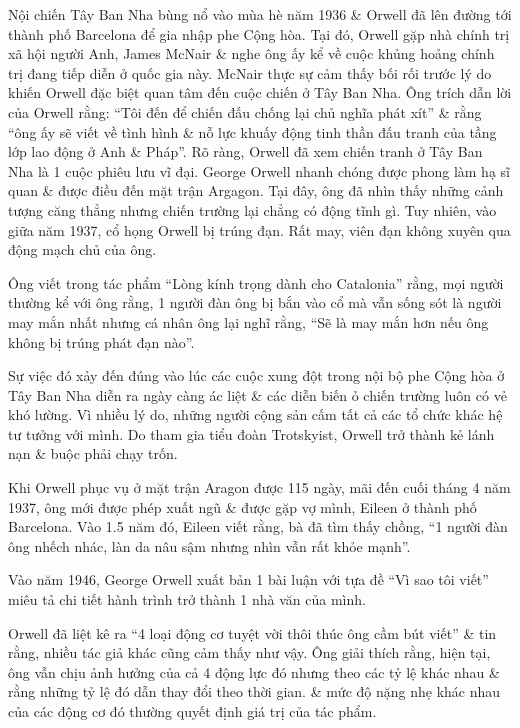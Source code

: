 \documentclass[oneside]{book}
\numberwithin{equation}{section}
\begin{document}
Nội chiến Tây Ban Nha bùng nổ vào mùa hè năm 1936 \& Orwell đã lên đường tới thành phố Barcelona để gia nhập phe Cộng hòa. Tại đó, Orwell gặp nhà chính trị xã hội người Anh, James McNair \& nghe ông ấy kể về cuộc khủng hoảng chính trị đang tiếp diễn ở quốc gia này. McNair thực sự cảm thấy bối rối trước lý do khiến Orwell đặc biệt quan tâm đến cuộc chiến ở Tây Ban Nha. Ông trích dẫn lời của Orwell rằng: ``Tôi đến để chiến đấu chống lại chủ nghĩa phát xít'' \& rằng ``ông ấy sẽ viết về tình hình \& nỗ lực khuấy động tinh thần đấu tranh của tầng lớp lao động ở Anh \& Pháp''. Rõ ràng, Orwell đã xem chiến tranh ở Tây Ban Nha là 1 cuộc phiêu lưu vĩ đại. George Orwell nhanh chóng được phong làm hạ sĩ quan \& được điều đến mặt trận Argagon. Tại đây, ông đã nhìn thấy những cảnh tượng căng thẳng nhưng chiến trường lại chẳng có động tĩnh gì. Tuy nhiên, vào giữa năm 1937, cổ họng Orwell bị trúng đạn. Rất may, viên đạn không xuyên qua động mạch chủ của ông.

Ông viết trong tác phẩm ``Lòng kính trọng dành cho Catalonia'' rằng, mọi người thường kể với ông rằng, 1 người đàn ông bị bắn vào cổ mà vẫn sống sót là người may mắn nhất nhưng cá nhân ông lại nghĩ rằng, ``Sẽ là may mắn hơn nếu ông không bị trúng phát đạn nào''.

Sự việc đó xảy đến đúng vào lúc các cuộc xung đột trong nội bộ phe Cộng hòa ở Tây Ban Nha diễn ra ngày càng ác liệt \& các diễn biến ỏ chiến trường luôn có vẻ khó lường. Vì nhiều lý do, những người cộng sản cấm tất cả các tổ chức khác hệ tư tưởng với mình. Do tham gia tiểu đoàn Trotskyist, Orwell trở thành kẻ lánh nạn \& buộc phải chạy trốn.

Khi Orwell phục vụ ở mặt trận Aragon được 115 ngày, mãi đến cuối tháng 4 năm 1937, ông mới được phép xuất ngũ \& được gặp vợ mình, Eileen ở thành phố Barcelona. Vào 1.5 năm đó, Eileen viết rằng, bà đã tìm thấy chồng, ``1 người đàn ông nhếch nhác, làn da nâu sậm nhưng nhìn vẫn rất khỏe mạnh''.

Vào năm 1946, George Orwell xuất bản 1 bài luận với tựa đề ``Vì sao tôi viết'' miêu tả chi tiết hành trình trở thành 1 nhà văn của mình.

Orwell đã liệt kê ra ``4 loại động cơ tuyệt vời thôi thúc ông cầm bút viết'' \& tin rằng, nhiều tác giả khác cũng cảm thấy như vậy. Ông giải thích rằng, hiện tại, ông vẫn chịu ảnh hưởng của cả 4 động lực đó nhưng theo các tỷ lệ khác nhau \& rằng những tỷ lệ đó dẫn thay đổi theo thời gian. \& mức độ nặng nhẹ khác nhau của các động cơ đó thường quyết định giá trị của tác phẩm.
\end{document}
